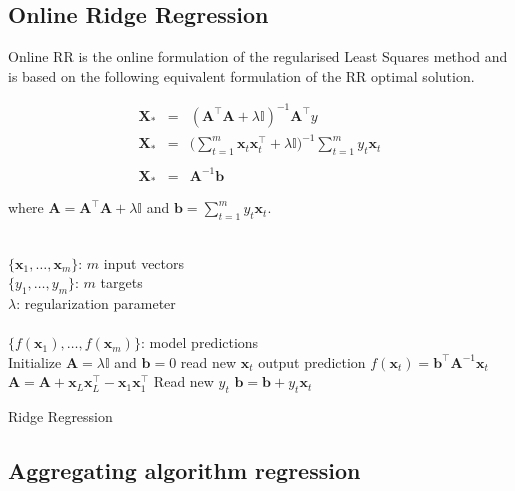\subsection{Online Ridge Regression}

Online RR is the online formulation of the regularised Least Squares method
and is based on the following equivalent formulation of the RR optimal solution.

\begin{eqnarray*}
\mathbf{\mathbf{X}}_*&=&(\mathbf{A}^\top \mathbf{A}+\lambda
\mathbb{I})^{-1}\mathbf{A}^\top y \\
\mathbf{\mathbf{X}}_* &=& \displaystyle \big (\sum_{t=1}^m
\mathbf{x}_t \mathbf{x}_t  ^\top + \lambda
\mathbb{I}\big)^{-1} \sum_{t=1}^m y_t
\mathbf{x}_t \\ \\
\mathbf{\mathbf{X}}_*&=& \mathbf{A}^{-1}\mathbf{b}
\end{eqnarray*}

\noindent where $\mathbf{A}=\mathbf{A}^\top \mathbf{A} +\lambda
\mathbb{I}$ and $\mathbf{b}=\displaystyle  \sum_{t=1}^m y_t \mathbf{x}_t$.


\begin{algorithm}[H]
\begin{algorithmic}[1]
\REQUIRE $\,$ \\
$\{\mathbf{x}_1,\dots,\mathbf{x}_{m} \}$: $m$ input vectors \\
$\{y_1,\dots,y_{m} \}$: $m$ targets \\
$\lambda$: regularization parameter \\
\ENSURE  $\,$ \\
$\{f(\mathbf{x}_1),\dots,f(\mathbf{x}_{m}) \}$: model predictions \\
\STATE Initialize $\mathbf{A}=\lambda \mathbb{I}$
and $\mathbf{b}=0$
	\STATE read new $\mathbf{x}_t$
	\STATE output prediction $f(\mathbf{x}_t) =  \mathbf{b}^\top \mathbf{A}^{-1}\mathbf{x}_t$
   	\STATE $\mathbf{A} = \mathbf{A} + \mathbf{x}_L
        \mathbf{x}_L^\top -\mathbf{x}_1 \mathbf{x}_1^\top $
   	\STATE Read new $y_t$
    	\STATE $\mathbf{b} = \mathbf{b} + y_t \mathbf{x}_t$
\ENDFOR

\end{algorithmic}
\caption{Ridge Regression}
\label{alg:RR}
\end{algorithm}


\subsection{Aggregating algorithm regression}


